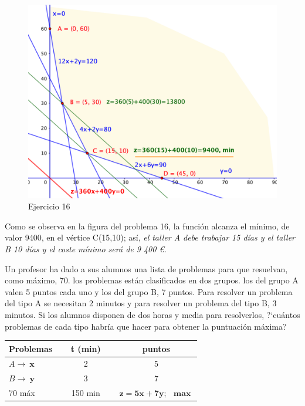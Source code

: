 \vspace{5mm}
\begin{figure}[h] %
	\centering
	\includegraphics[width=.75\textwidth]{imagenes/img44.png}
	\caption*{Ejercicio 16}
\end{figure}

Como se observa en la figura del problema 16, la función alcanza el mínimo, de valor 9400, en el vértice C(15,10); así, \emph{el taller A debe trabajar 15 días y el taller B 10 días y el coste mínimo será de 9 400 \euro.}


\vspace{10mm}
\begin{ejemplo}
\begin{ejer}
	Un profesor ha dado a sus alumnos una lista de problemas para que resuelvan, como máximo, 70. los problemas están clasificados en dos grupos. los del grupo A valen 5 puntos cada uno y los del grupo B, 7 puntos. Para resolver un problema del tipo A se necesitan 2 minutos y para resolver un problema del tipo B, 3 minutos. Si los alumnos disponen de dos horas y media para resolverlos, ?`cuántos problemas de cada tipo habría que hacer para obtener la puntuación máxima?
\end{ejer}	
\end{ejemplo}
\vspace{5mm}

\begin{table}[H]
\centering
\begin{tabular}{lcc}
Problemas & t (min) & puntos \\ \hline
$A \to \ \boldsymbol{x} \quad $ & 2 & 5 \\
$B \to \ \boldsymbol{y} \quad$ & 3 & 7 \\ \hline
70 máx $\quad$& $\quad$ 150 min $\quad$ & $\boldsymbol{z=5x+7y;\ \ \max}$
\end{tabular}
\end{table}

